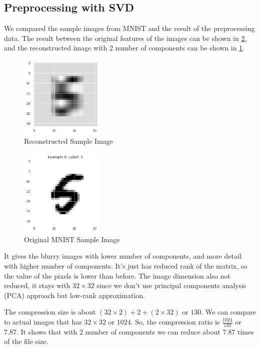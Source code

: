 \documentclass[conference]{IEEEtran}
\begin{document}
\subsection{Preprocessing with SVD}
We compared the sample images from MNIST and the result of the preprocessing data. 
The result between the original features of the images can be shown in \ref{fig:original_img}, and the reconstructed image with 2 number of components can be shown in \ref{fig:svd_2_comp}.
\begin{figure}[htbp]
    \centerline{\includegraphics[width=4cm]{SVD_2_comp.png}}
    \caption{Reconstructed Sample Image }
    \label{fig:svd_2_comp}
\end{figure}
\begin{figure}[htbp]
    \centerline{\includegraphics[width=4cm]{raw_image.png}}
    \caption{Original MNIST Sample Image}
    \label{fig:original_img}
\end{figure}
It gives the blurry images with lower number of components, and more detail with higher number of components. It's just has reduced rank of the matrix, 
so the value of the pixels is lower than before. The image dimension also not reduced, it stays with $32\times32$ since we don't use principal components analysis (PCA) approach but low-rank approximation.  

The compression size is about $(32\times2) + 2 + (2\times 32)$ or $130$. We can compare to actual images that has $32 \times 32$ or $1024$. So, the compression ratio is $\frac{1024}{130}$ or $7.87$. 
It shows that with 2 number of components we can reduce about $7.87$ times of the file size.
\end{document}
